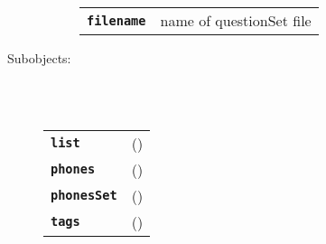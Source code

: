 \begin{description}
\begin{description}
      \begin{tabular}{ll}
 \texttt{\textbf{filename}} &  name of questionSet file  \\
      \end{tabular}
    \end{description}

  \item[Subobjects:] \hfill \\
\ 
    \begin{tabular}{ll}
      \texttt{\textbf{list}} & (\Jref{module}{List}) \\
      \texttt{\textbf{phones}} & (\Jref{module}{Phones}) \\
      \texttt{\textbf{phonesSet}} & (\Jref{module}{PhonesSet}) \\
      \texttt{\textbf{tags}} & (\Jref{module}{Tags}) \\
    \end{tabular}
\vspace{3mm}

\end{description}

